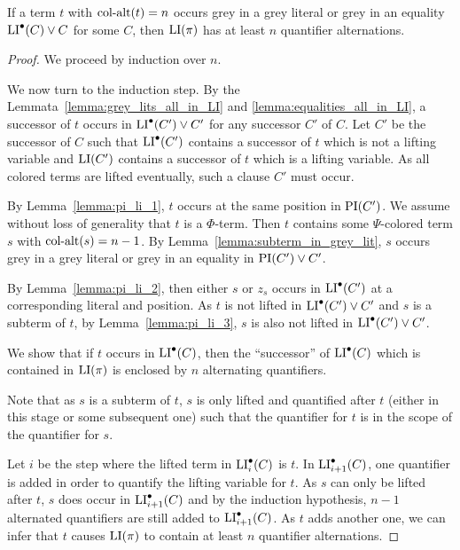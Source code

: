 \documentclass[%
	draft=false,%
	numbers=noendperiod,%
	11pt,%
	a4paper,%
	oneside,%
	openany,%
]{memoir}
\begin{document}
\begin{clemma}
	If a term $t$ with $\operatorname{col-alt}(t)=n$ occurs grey in a grey literal or grey in an equality $\operatorname{LI}^\bullet(C) \lor C$ for some $C$, then $\operatorname{LI}(\pi)$ has at least $n$ quantifier alternations.
\end{clemma}
\begin{proof}
	We proceed by induction over $n$.


	We now turn to the induction step.
	By the Lemmata~\ref{lemma:grey_lits_all_in_LI} and \ref{lemma:equalities_all_in_LI}, a successor of $t$ occurs in $\operatorname{LI}^\bullet(C') \lor C'$ for any successor $C'$ of $C$.
	Let $C'$ be the successor of $C$ such that $\operatorname{LI}^\bullet(C')$ contains a successor of $t$ which is not a lifting variable and $\operatorname{LI}(C')$ contains a successor of $t$ which is a lifting variable.
	As all colored terms are lifted eventually, such a clause $C'$ must occur.

	By Lemma~\ref{lemma:pi_li_1}, $t$ occurs at the same position in $\operatorname{PI}(C')$.
	We assume without loss of generality that $t$ is a $\Phi$-term.
	Then $t$ contains some $\Psi$-colored term $s$ with $\operatorname{col-alt}(s) = n-1$.
	By Lemma~\ref{lemma:subterm_in_grey_lit}, $s$ occurs grey in a grey literal or grey in an equality in $\operatorname{PI}(C')\lor C'$.

	By Lemma~\ref{lemma:pi_li_2}, then either $s$ or $z_s$ occurs in $\operatorname{LI}^\bullet(C')$ at a corresponding literal and position. 
	As $t$ is not lifted in $\operatorname{LI}^\bullet(C') \lor C'$ and $s$ is a subterm of $t$, by Lemma~\ref{lemma:pi_li_3}, $s$ is also not lifted in $\operatorname{LI}^\bullet(C') \lor C'$.

	We show that if $t$ occurs in $\operatorname{LI}^\bullet(C)$, then the ``successor'' of $\operatorname{LI}^\bullet(C)$ which is contained in $\operatorname{LI}(\pi)$ is enclosed by $n$ alternating quantifiers. 

	Note that as $s$ is a subterm of $t$, $s$ is only lifted and quantified after $t$ (either in this stage or some subsequent one) such that the quantifier for $t$ is in the scope of the quantifier for $s$. 

	Let $i$ be the step where the lifted term in  $\operatorname{LI}^\bullet_i(C)$ is $t$.
	In $\operatorname{LI}^\bullet_{i+1}(C)$, one quantifier is added in order to quantify the lifting variable for $t$.
	As $s$ can only be lifted after $t$, $s$ does occur in $\operatorname{LI}^\bullet_{i+1}(C)$ and by the induction hypothesis, $n-1$ alternated quantifiers are still added to $\operatorname{LI}^\bullet_{i+1}(C)$.
	As $t$ adds another one, we can infer that $t$ causes $\operatorname{LI}(\pi)$ to contain at least $n$ quantifier alternations.
\end{proof}
\end{document}
